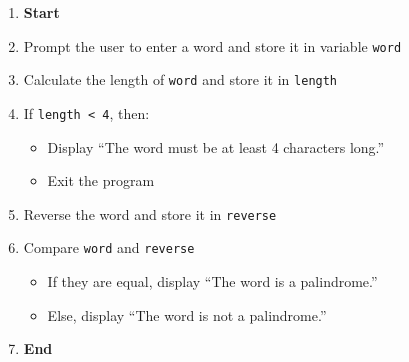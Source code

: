 \begin{enumerate}
    \item \textbf{Start}
    \item Prompt the user to enter a word and store it in variable \texttt{word}
    \item Calculate the length of \texttt{word} and store it in \texttt{length}
    \item If \texttt{length < 4}, then:
    \begin{itemize}
        \item Display ``The word must be at least 4 characters long.''
        \item Exit the program
    \end{itemize}
    \item Reverse the word and store it in \texttt{reverse}
    \item Compare \texttt{word} and \texttt{reverse}
    \begin{itemize}
        \item If they are equal, display ``The word is a palindrome.''
        \item Else, display ``The word is not a palindrome.''
    \end{itemize}
    \item \textbf{End}
\end{enumerate}


